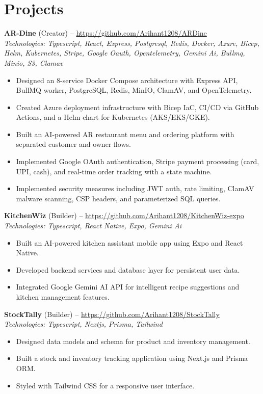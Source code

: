 \documentclass[11pt,a4paper]{article}
\begin{document}
\section{Projects}
\textbf{AR-Dine} (Creator) -- \href{https://github.com/Arihant1208/ARDine}{https://github.com/Arihant1208/ARDine}
\\ \textit{Technologies: Typescript, React, Express, Postgresql, Redis, Docker, Azure, Bicep, Helm, Kubernetes, Stripe, Google Oauth, Opentelemetry, Gemini Ai, Bullmq, Minio, S3, Clamav}
\begin{itemize}
  \item Designed an 8-service Docker Compose architecture with Express API, BullMQ worker, PostgreSQL, Redis, MinIO, ClamAV, and OpenTelemetry.
  \item Created Azure deployment infrastructure with Bicep IaC, CI/CD via GitHub Actions, and a Helm chart for Kubernetes (AKS/EKS/GKE).
  \item Built an AI-powered AR restaurant menu and ordering platform with separated customer and owner flows.
  \item Implemented Google OAuth authentication, Stripe payment processing (card, UPI, cash), and real-time order tracking with a state machine.
  \item Implemented security measures including JWT auth, rate limiting, ClamAV malware scanning, CSP headers, and parameterized SQL queries.
\end{itemize}
\vspace{2pt}
\textbf{KitchenWiz} (Builder) -- \href{https://github.com/Arihant1208/KitchenWiz-expo}{https://github.com/Arihant1208/KitchenWiz-expo}
\\ \textit{Technologies: Typescript, React Native, Expo, Gemini Ai}
\begin{itemize}
  \item Built an AI-powered kitchen assistant mobile app using Expo and React Native.
  \item Developed backend services and database layer for persistent user data.
  \item Integrated Google Gemini AI API for intelligent recipe suggestions and kitchen management features.
\end{itemize}
\vspace{2pt}
\textbf{StockTally} (Builder) -- \href{https://github.com/Arihant1208/StockTally}{https://github.com/Arihant1208/StockTally}
\\ \textit{Technologies: Typescript, Nextjs, Prisma, Tailwind}
\begin{itemize}
  \item Designed data models and schema for product and inventory management.
  \item Built a stock and inventory tracking application using Next.js and Prisma ORM.
  \item Styled with Tailwind CSS for a responsive user interface.
\end{itemize}
\vspace{2pt}
\end{document}
